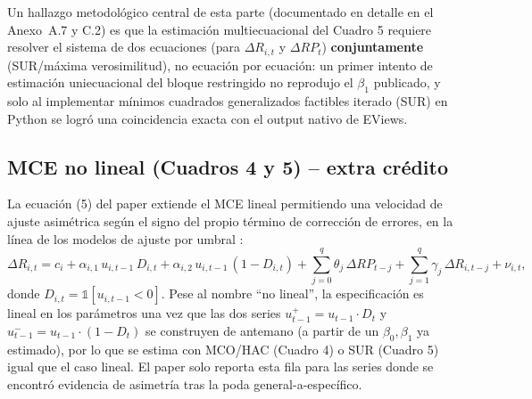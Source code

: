 \documentclass[12pt, letterpaper]{article}
\begin{document}
Un hallazgo metodológico central de esta parte (documentado en detalle
en el Anexo~A.7 y C.2) es que la estimación multiecuacional del Cuadro
5 requiere resolver el sistema de dos ecuaciones (para $\Delta R_{i,t}$
y $\Delta RP_t$) \textbf{conjuntamente} (SUR/máxima verosimilitud), no
ecuación por ecuación: un primer intento de estimación uniecuacional
del bloque restringido no reprodujo el $\beta_1$ publicado, y solo al
implementar mínimos cuadrados generalizados factibles iterado (SUR) en
Python se logró una coincidencia exacta con el output nativo de EViews.

\subsection{MCE no lineal (Cuadros 4 y 5) -- extra crédito}

La ecuación (5) del paper extiende el MCE lineal permitiendo una
velocidad de ajuste asimétrica según el signo del propio término de
corrección de errores, en la línea de los modelos de ajuste por umbral
\parencite{enders2001}:
\begin{equation}
  \Delta R_{i,t} = c_i + \alpha_{i,1}\,u_{i,t-1}\,D_{i,t}
  + \alpha_{i,2}\,u_{i,t-1}\,(1-D_{i,t})
  + \sum_{j=0}^{q}\theta_j\,\Delta RP_{t-j}
  + \sum_{j=1}^{q}\gamma_j\,\Delta R_{i,t-j} + \nu_{i,t},
\end{equation}
donde $D_{i,t}=\mathbb{1}[u_{i,t-1}<0]$. Pese al nombre ``no lineal'',
la especificación es lineal en los parámetros una vez que las dos
series $u^{+}_{t-1}=u_{t-1}\cdot D_t$ y $u^{-}_{t-1}=u_{t-1}\cdot(1-D_t)$
se construyen de antemano (a partir de un $\beta_0,\beta_1$ ya
estimado), por lo que se estima con MCO/HAC (Cuadro 4) o SUR (Cuadro
5) igual que el caso lineal. El paper solo reporta esta fila para las
series donde se encontró evidencia de asimetría tras la poda
general-a-específico.
\end{document}
